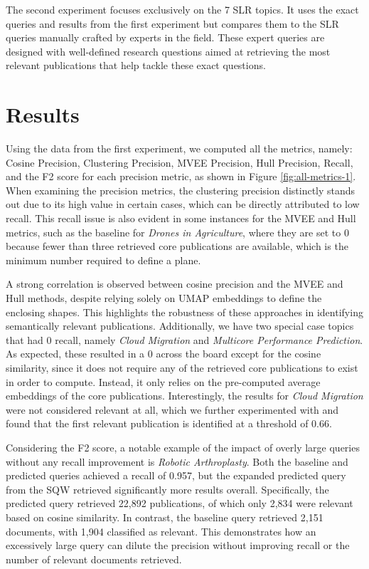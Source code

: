 The second experiment focuses exclusively on the 7 SLR topics. It uses the exact queries and results from the first experiment but compares them to the SLR queries manually crafted by experts in the field. These expert queries are designed with well-defined research questions aimed at retrieving the most relevant publications that help tackle these exact questions.

\section{Results}
Using the data from the first experiment, we computed all the metrics, namely: Cosine Precision, Clustering Precision, MVEE Precision, Hull Precision, Recall, and the F2 score for each precision metric, as shown in Figure \ref{fig:all-metrics-1}. When examining the precision metrics, the clustering precision distinctly stands out due to its high value in certain cases, which can be directly attributed to low recall. This recall issue is also evident in some instances for the MVEE and Hull metrics, such as the baseline for \textit{Drones in Agriculture}, where they are set to 0 because fewer than three retrieved core publications are available, which is the minimum number required to define a plane.

A strong correlation is observed between cosine precision and the MVEE and Hull methods, despite relying solely on UMAP embeddings to define the enclosing shapes. This highlights the robustness of these approaches in identifying semantically relevant publications. Additionally, we have two special case topics that had 0 recall, namely \textit{Cloud Migration} and \textit{Multicore Performance Prediction}. As expected, these resulted in a 0 across the board except for the cosine similarity, since it does not require any of the retrieved core publications to exist in order to compute. Instead, it only relies on the pre-computed average embeddings of the core publications. Interestingly, the results for \textit{Cloud Migration} were not considered relevant at all, which we further experimented with and found that the first relevant publication is identified at a threshold of 0.66.


Considering the F2 score, a notable example of the impact of overly large queries without any recall improvement is \textit{Robotic Arthroplasty}. Both the baseline and predicted queries achieved a recall of 0.957, but the expanded predicted query from the SQW retrieved significantly more results overall. Specifically, the predicted query retrieved 22,892 publications, of which only 2,834 were relevant based on cosine similarity. In contrast, the baseline query retrieved 2,151 documents, with 1,904 classified as relevant. This demonstrates how an excessively large query can dilute the precision without improving recall or the number of relevant documents retrieved.

